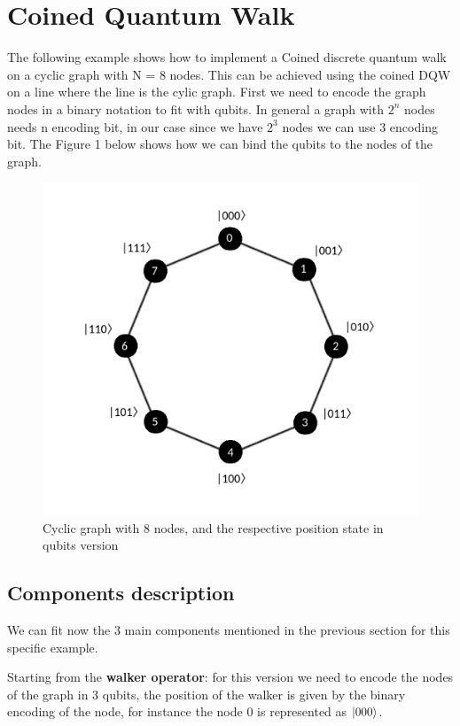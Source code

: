 \section{Coined Quantum Walk}

The following example shows how to implement a Coined discrete quantum walk on a cyclic graph with N = 8 nodes. This can be achieved using the coined DQW on a line
where the line is the cylic graph. First we need to encode the graph nodes in a binary notation to fit with qubits. In general a graph with $2^{n}$ nodes needs n encoding 
bit, in our case since we have $2^{3}$ nodes we can use 3 encoding bit. The Figure 1 below shows how we can bind the qubits to the nodes of the graph.

\begin{figure}[h!]
    \includegraphics[scale=0.3]{img/cyclic_graph.png}
    \caption{Cyclic graph with 8 nodes, and the respective position state in qubits version}
    \centering
\end{figure}

\subsection{Components description}

We can fit now the 3 main components mentioned in the previous section for this specific example. 

Starting from the \textbf{walker operator}: for this version we need to encode the nodes of the graph in 3 qubits, the position of the walker 
is given by the binary encoding of the node, for instance the node 0 is represented as $\ket{000}$.

